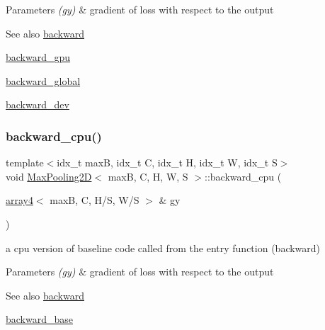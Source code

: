 \begin{DoxyParams}{Parameters}
{\em (gy)} & gradient of loss with respect to the output \\
\hline
\end{DoxyParams}
\begin{DoxySeeAlso}{See also}
\hyperlink{structMaxPooling2D_ae0ad0f868dcf5f976f4dd99dd91e2f91}{backward} 

\hyperlink{structMaxPooling2D_ae7d3c7c84e64b9060471973b58899315}{backward\+\_\+gpu} 

\hyperlink{softmaxcrossentropy_8h_a47d56a9a23e08247b227f4aac17413e0}{backward\+\_\+global} 

\hyperlink{structMaxPooling2D_ad54e972c24822a97aac4f43066d25db8}{backward\+\_\+dev} 
\end{DoxySeeAlso}
\mbox{\label{structMaxPooling2D_a28487a560998c1eb511f3d4e3b948fd6}} 
\subsubsection{\texorpdfstring{backward\+\_\+cpu()}{backward\_cpu()}}
{\footnotesize\ttfamily template$<$idx\+\_\+t maxB, idx\+\_\+t C, idx\+\_\+t H, idx\+\_\+t W, idx\+\_\+t S$>$ \\
void \hyperlink{structMaxPooling2D}{Max\+Pooling2D}$<$ maxB, C, H, W, S $>$\+::backward\+\_\+cpu (\begin{DoxyParamCaption}\item[{\hyperlink{structarray4}{array4}$<$ maxB, C, H/S, W/S $>$ \&}]{gy }\end{DoxyParamCaption})\hspace{0.3cm}{\ttfamily [inline]}}



a cpu version of baseline code called from the entry function (backward) 


\begin{DoxyParams}{Parameters}
{\em (gy)} & gradient of loss with respect to the output \\
\hline
\end{DoxyParams}
\begin{DoxySeeAlso}{See also}
\hyperlink{structMaxPooling2D_ae0ad0f868dcf5f976f4dd99dd91e2f91}{backward} 

\hyperlink{structMaxPooling2D_a3a2ce37cba46cc7cfd219e55bb3c2f29}{backward\+\_\+base} 
\end{DoxySeeAlso}
\mbox{\label{structMaxPooling2D_ad54e972c24822a97aac4f43066d25db8}} 
